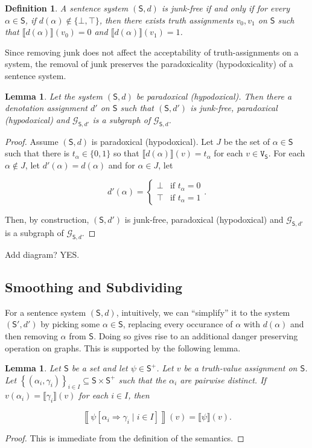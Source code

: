 \documentclass[12pt]{article}
\newtheorem{lem}[thm]{Lemma}
\newtheorem{defn}{Definition}
\theoremstyle{remark}
\newcommand{\fancy}[1]{\mathcal{#1}}
\def\S{\textsf{S}}
\def\V{\texttt{V}}
\def\G{\fancy{G}}
\begin{document}
\begin{defn}
A sentence system $(\S, d)$ is \emph{junk-free} if and only if for every $\alpha \in \S$, if $d(\alpha) \not \in \{\bot, \top\}$, then there exists truth assignments $v_0, v_1$ on $\S$ such that $\llbracket d(\alpha)\rrbracket(v_0) = 0$ and  $\llbracket d(\alpha)\rrbracket(v_1) = 1$.
\end{defn}

Since removing junk does not affect the acceptability of truth-assignments on a system, the removal of junk preserves the paradoxicality (hypodoxicality) of a sentence system.

\begin{lem}\label{JunkRemoval}
Let the system $(\S, d)$ be paradoxical (hypodoxical).  Then there a denotation assignment $d'$ on $\S$ such that $(\S, d')$ is junk-free, paradoxical (hypodoxical) and $\G_{\S, d'}$ is a subgraph of $\G_{\S, d}$.
\end{lem}
\begin{proof}
Assume $(\S, d)$ is paradoxical (hypodoxical). Let $J$ be the set of $\alpha \in \S$ such that there is $t_{\alpha} \in \{0, 1\}$ so that $\llbracket d(\alpha) \rrbracket(v) = t_{\alpha}$ for each $v \in \V_\S$.  For each $\alpha \not \in J$, let $d'(\alpha) = d(\alpha)$ and for $\alpha \in J$, let 

\[d'(\alpha) = \begin{cases}
\bot & \text{if } t_{\alpha} = 0 \\
\top & \text{if }  t_{\alpha} = 1
\end{cases}.\]

Then, by construction, $(\S, d')$ is junk-free, paradoxical (hypodoxical) and $\G_{\S, d'}$ is a subgraph of $\G_{\S, d}$.
\end{proof}

Add diagram? YES.

\subsection{Smoothing and Subdividing}

For a sentence system $(\S, d)$, intuitively, we can ``simplify'' it to the system $(\S', d')$ by picking some $\alpha \in \S$, replacing every occurance of $\alpha$ with $d(\alpha)$ and then removing $\alpha$ from $\S$.  Doing so gives rise to an additional danger preserving operation on graphs.  This is supported by the following lemma.

\begin{lem}\label{SubstitutionLemma}
Let $\S$ be a set and let $\psi \in \S^+$.  Let $v$ be a truth-value assignment on $\S$.  Let $\left\{ (\alpha_i, \gamma_i)\right\}_{i \in I} \subseteq \S \times \S^+$ such that the $\alpha_i$ are pairwise distinct. If $v(\alpha_i) = \llbracket \gamma_i \rrbracket(v)$ for each $i \in I$, then

\[\left\llbracket \psi\left[\alpha_i \Rightarrow \gamma_i \mid i \in I\right]\right\rrbracket(v) = \llbracket \psi \rrbracket(v).\] 
\end{lem}
\begin{proof}
This is immediate from the definition of the semantics.
\end{proof}
\end{document}
